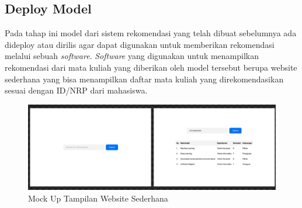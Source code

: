 \begin{adjustwidth}{1em}{0pt}
  \subsection{Deploy Model}
  Pada tahap ini model dari sistem rekomendasi yang telah dibuat sebelumnya ada dideploy atau dirilis agar dapat digunakan untuk memberikan rekomendasi melalui sebuah \emph{software}.
  \emph{Software} yang digunakan untuk menampilkan rekomendasi dari mata kuliah yang diberikan oleh model tersebut berupa website sederhana yang bisa menampilkan daftar mata kuliah
  yang direkomendasikan sesuai dengan ID/NRP dari mahasiswa.

  \begin{figure} [ht] \centering
    \includegraphics[width=150mm]{gambar/mockup.png}
    \caption{Mock Up Tampilan Website Sederhana}
  \end{figure}
\end{adjustwidth}



